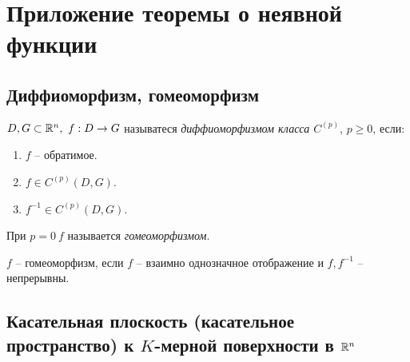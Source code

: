 \section{Приложение теоремы о неявной функции}

\setcounter{subsection}{11}

\subsection{Диффиоморфизм, гомеоморфизм}

\begin{definition}
    $ D,G \subset \mathbb{R}^n, \ f:D \rightarrow G $ называтеся \emph{диффиоморфизмом класса $ C^{(p)} $}, $ p \geqslant 0 $, если:
    \begin{enumerate}
        \item $ f $ -- обратимое.
        \item $ f \in C^{(p)}(D,G) $.
        \item $ f^{-1} \in C^{(p)}(D,G) $.
    \end{enumerate}

    При $ p=0 \ f $ называется \emph{гомеоморфизмом}.
\end{definition}

\begin{note}
    $ f $ -- гомеоморфизм, если $ f $ -- взаимно однозначное отображение и $ f,f^{-1} $ -- непрерывны.
\end{note}

\newpage

\subsection{Касательная плоскость (касательное пространство) к $ K $-мерной поверхности в $ \mathbb{R}^n $}

